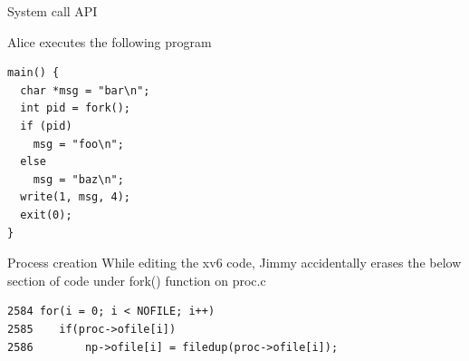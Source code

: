 \documentclass[11pt]{exam}
\begin{document}
\begin{questions}

\newpage
\addpoints
\question System call API

Alice 
%
%
executes the following program
\begin{verbatim}
main() {
  char *msg = "bar\n";
  int pid = fork();
  if (pid)
    msg = "foo\n";
  else
    msg = "baz\n";
  write(1, msg, 4);
  exit(0);
}
\end{verbatim}


\addpoints
\question Process creation
While editing the xv6 code, Jimmy accidentally erases the below section of
code under fork() function on proc.c
\begin{verbatim}
2584 for(i = 0; i < NOFILE; i++)
2585    if(proc->ofile[i])
2586        np->ofile[i] = filedup(proc->ofile[i]);
\end{verbatim}

\end{questions}
\end{document}
